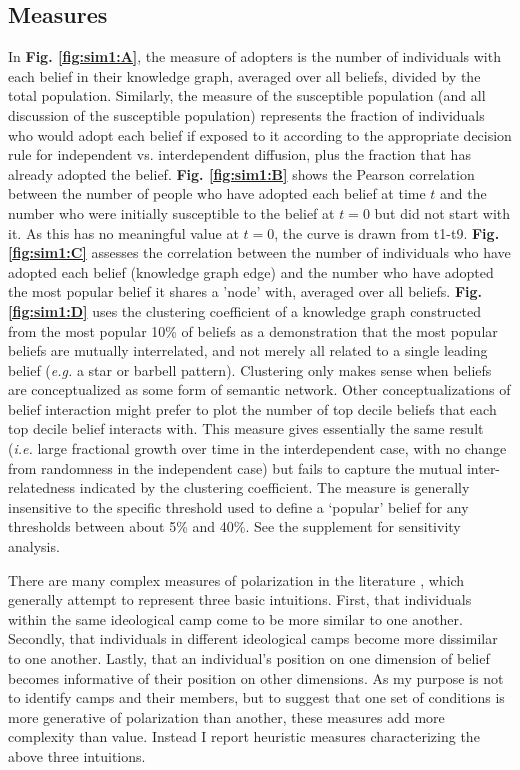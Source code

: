 \documentclass[9pt,twocolumn,twoside,lineno]{pnas-new}
\begin{document}
{\subsection*{Measures}

In \textbf{Fig. \ref{fig:sim1:A}}, the measure of adopters is the number of individuals with each belief in their knowledge graph, averaged over all beliefs, divided by the total population. Similarly, the measure of the susceptible population (and all discussion of the susceptible population) represents the fraction of individuals who would adopt each belief if exposed to it according to the appropriate decision rule for independent vs. interdependent diffusion, plus the fraction that has already adopted the belief. 
\textbf{Fig. \ref{fig:sim1:B}} shows the Pearson correlation between the number of people who have adopted each belief at time $t$ and the number who were initially susceptible to the belief at $t=0$ but did not start with it. As this has no meaningful value at $t=0$, the curve is drawn from t1-t9.
\textbf{Fig. \ref{fig:sim1:C}} assesses the correlation between the number of individuals who have adopted each belief (knowledge graph edge) and the number who have adopted the most popular belief it shares a 'node' with, averaged over all beliefs. 
\textbf{Fig. \ref{fig:sim1:D}} uses the clustering coefficient of a knowledge graph constructed from the most popular 10\% of beliefs as a demonstration that the most popular beliefs are mutually interrelated, and not merely all related to a single leading belief (\textit{e.g.} a star or barbell pattern). Clustering only makes sense when beliefs are conceptualized as some form of semantic network. Other conceptualizations of belief interaction might prefer to plot the number of top decile beliefs that each top decile belief interacts with. This measure gives essentially the same result (\textit{i.e.} large fractional growth over time in the interdependent case, with no change from randomness in the independent case) but fails to capture the mutual inter-relatedness indicated by the clustering coefficient. The measure is generally insensitive to the specific threshold used to define a ‘popular’ belief for any thresholds between about 5\% and 40\%. See the supplement for sensitivity analysis. 

There are many complex measures of polarization in the literature \cite[for a sample]{baldassarri2007dynamics,dellaposta2015liberals,goldberg2018beyond,flache2011small,del2016echo,dandekar2013biased,vasconcelos2019consensus,spohr2017fake,tornberg2018echo,pennycook2019lazy}, which generally attempt to represent three basic intuitions. First, that individuals within the same ideological camp come to be more similar to one another. Secondly, that individuals in different ideological camps become more dissimilar to one another. Lastly, that an individual’s position on one dimension of belief becomes informative of their position on other dimensions. As my purpose is not to identify camps and their members, but to suggest that one set of conditions is more generative of polarization than another, these measures add more complexity than value. Instead I report heuristic measures characterizing the above three intuitions.

}
\end{document}
